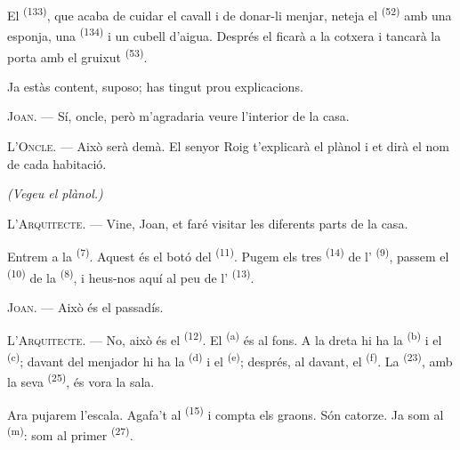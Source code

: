 El  \textsuperscript{(133)}, que acaba de cuidar el cavall i de
donar-li menjar, neteja el  \textsuperscript{(52)} amb una esponja, una
 \textsuperscript{(134)} i un cubell d'aigua. Després el ficarà a la
cotxera i tancarà la porta amb el gruixut
 \textsuperscript{(53)}.

Ja estàs content, suposo; has tingut prou explicacions.

\textsc{Joan}. --- Sí, oncle, però m'agradaria veure l'interior de la casa.

\textsc{L'Oncle}. --- Això serà demà. El senyor Roig t'explicarà el plànol i et dirà el nom de
cada habitació.

\VUsaut{3.0mm}
\VUsaut{2.4mm}

{\centering\textit{(Vegeu el plànol.)}\par}
\VUsaut{2.4mm}

\textsc{L'Arquitecte}. --- Vine, Joan, et faré visitar les diferents parts de la casa.

Entrem a la  \textsuperscript{(7)}. Aquest és el botó del
 \textsuperscript{(11)}. Pugem els tres 
\textsuperscript{(14)} de l' \textsuperscript{(9)}, passem el
 \textsuperscript{(10)} de la 
\textsuperscript{(8)}, i heus-nos aquí al peu de l' \textsuperscript{(13)}.

\textsc{Joan}. --- Això és el passadís.

\textsc{L'Arquitecte}. --- No, això és el  \textsuperscript{(12)}. El
 \textsuperscript{(a)} és al fons. A la dreta hi ha la 
\textsuperscript{(b)} i el
 \textsuperscript{(c)}; davant del menjador hi ha la
 \textsuperscript{(d)} i el 
\textsuperscript{(e)}; després, al davant, el  \textsuperscript{(f)}. La
 \textsuperscript{(23)}, amb la seva
 \textsuperscript{(25)}, és vora la sala.

Ara pujarem l'escala. Agafa't al  \textsuperscript{(15)} i compta els graons.
Són catorze. Ja som al  \textsuperscript{(m)}: som al primer 
\textsuperscript{(27)}.

